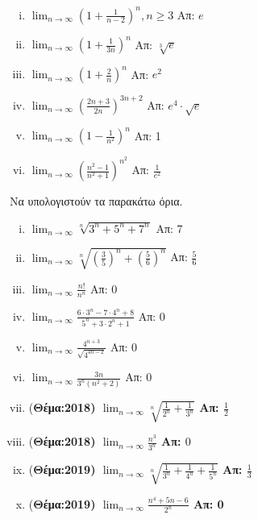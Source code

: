 \begin{enumerate}
        \begin{enumerate}[i)]
            \item $ \lim_{n \to \infty} \left(1+ \frac{1}{n-2}\right)^{n}, 
                n \geq 3 $ 
                \hfill Απ: $e$  
            \item $ \lim_{n \to \infty} \left(1 + \frac{1}{3n}\right)^{n} $ 
                \hfill Απ: $ \sqrt[3]{e} $ 
            \item $ \lim_{n \to \infty} \left(1+ \frac{2}{n}\right)^{n} $ 
                \hfill Απ: $ e^{2} $ 
            \item $ \lim_{n \to \infty} \left(\frac{2n +3}{2n} \right)^{3n+2}  $
                \hfill Απ: $ e^{4}\cdot \sqrt{e} $ 
            \item $ \lim_{n \to \infty}\left(1-\frac{1}{n^{2}} \right)^{n} $ 
                \hfill Απ: 1 
            \item $ \lim_{n \to \infty} \left(\frac{n^{2}-1}{n^{2}+1} \right)^{n^{2}} $
                \hfill Απ: $ \frac{1}{e^{2}} $ 
        \end{enumerate}
\end{enumerate}




Να υπολογιστούν τα παρακάτω όρια.

\begin{enumerate}[i)]
    \item $ \lim_{n \to \infty} \sqrt[n]{3^{n}+5^{n}+7^{n}}  $ \hfill Απ: 7 
    \item $ \lim_{n \to \infty} \sqrt[n]{\left(\frac{3}{5} \right)^{n} + 
        \left(\frac{5}{6} \right)^{n}} $ \hfill Απ: $ \frac{5}{6} $ 
    \item $ \lim_{n \to \infty} \frac{n!}{n^{n}} $ \hfill Απ: 0  
    \item $ \lim_{n \to \infty} \frac{6\cdot 3^{n}-7 \cdot 4^{n}+8}
        {5^{n}+3\cdot 2^{n}+1} $ \hfill Απ: 0  
    \item $ \lim_{n \to \infty} \frac{4^{n+3}}{\sqrt{4^{4n-2}}} $ \hfill Απ: 0  
    \item $ \lim_{n \to \infty} \frac{3n}{3^{n}(n^{2}+2)} $ \hfill Απ: 0  
    \item (\bfseries Θέμα:2018) $ \lim_{n \to \infty} \sqrt[n]{\frac{1}{2^{n}}+ 
        \frac{1}{3^{n}}} $ \hfill Απ: $ \frac{1}{2} $ 
    \item (\bfseries Θέμα:2018) $ \lim_{n \to \infty} \frac{n^{3}}{3^{n}} $ 
        \hfill Απ: $ 0 $
    \item (\bfseries Θέμα:2019) $ \lim_{n \to \infty} \sqrt[n]{\frac{1}{3^{n}} + 
        \frac{1}{4^{n}} + \frac{1}{5^{n}}} $ \hfill Απ: $ \frac{1}{3} $
    \item (\bfseries Θέμα:2019) $ \lim_{n \to \infty} \frac{n^{4}+5n-6}{2^{n}} $ 
        \hfill Απ: 0 
\end{enumerate}


